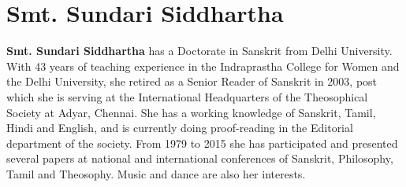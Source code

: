 \section*{Smt. Sundari Siddhartha}

\textbf{Smt. Sundari Siddhartha} has a Doctorate in Sanskrit from Delhi University. With 43 years of teaching experience in the Indraprastha College for Women and the Delhi University, she retired as a Senior Reader of Sanskrit in 2003, post which she is serving at the International Headquarters of the Theosophical Society at Adyar, Chennai. She has a working knowledge of Sanskrit, Tamil, Hindi and English, and is currently doing proof-reading in the Editorial department of the society. From 1979 to 2015 she has participated and presented several papers at national and international conferences of Sanskrit, Philosophy, Tamil and Theosophy. Music and dance are also her interests.

